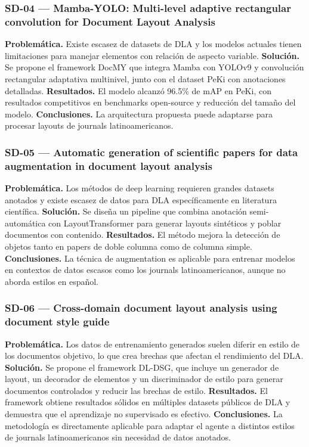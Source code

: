 \subsubsection*{SD-04 --- Mamba-YOLO: Multi-level adaptive rectangular convolution for Document Layout Analysis \cite{ref17}}

\textbf{Problemática.} Existe escasez de datasets de DLA y los modelos actuales tienen limitaciones para manejar elementos con relación de aspecto variable. \textbf{Solución.} Se propone el framework DocMY que integra Mamba con YOLOv9 y convolución rectangular adaptativa multinivel, junto con el dataset PeKi con anotaciones detalladas. \textbf{Resultados.} El modelo alcanzó 96.5\% de mAP en PeKi, con resultados competitivos en benchmarks open-source y reducción del tamaño del modelo. \textbf{Conclusiones.} La arquitectura propuesta puede adaptarse para procesar layouts de journals latinoamericanos.

\subsubsection*{SD-05 --- Automatic generation of scientific papers for data augmentation in document layout analysis \cite{ref18}}

\textbf{Problemática.} Los métodos de deep learning requieren grandes datasets anotados y existe escasez de datos para DLA específicamente en literatura científica. \textbf{Solución.} Se diseña un pipeline que combina anotación semi-automática con LayoutTransformer para generar layouts sintéticos y poblar documentos con contenido. \textbf{Resultados.} El método mejora la detección de objetos tanto en papers de doble columna como de columna simple. \textbf{Conclusiones.} La técnica de augmentation es aplicable para entrenar modelos en contextos de datos escasos como los journals latinoamericanos, aunque no aborda estilos en español.

\subsubsection*{SD-06 --- Cross-domain document layout analysis using document style guide \cite{ref19}}

\textbf{Problemática.} Los datos de entrenamiento generados suelen diferir en estilo de los documentos objetivo, lo que crea brechas que afectan el rendimiento del DLA. \textbf{Solución.} Se propone el framework DL-DSG, que incluye un generador de layout, un decorador de elementos y un discriminador de estilo para generar documentos controlados y reducir las brechas de estilo. \textbf{Resultados.} El framework obtiene resultados sólidos en múltiples datasets públicos de DLA y demuestra que el aprendizaje no supervisado es efectivo. \textbf{Conclusiones.} La metodología es directamente aplicable para adaptar el agente a distintos estilos de journals latinoamericanos sin necesidad de datos anotados.

